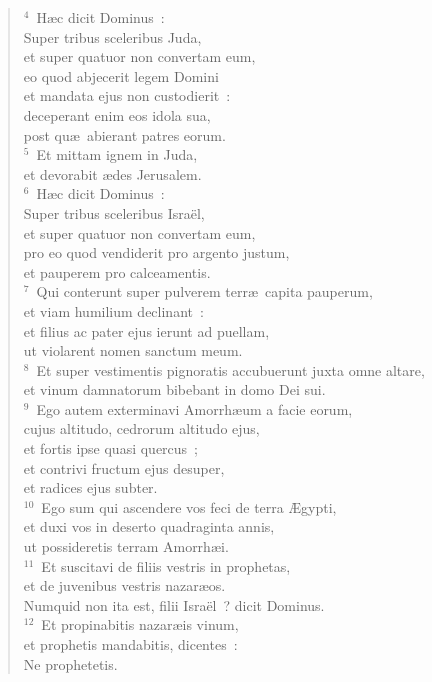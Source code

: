 \begin{verse}${}^{4}$~H\ae c dicit Dominus~:\\ Super tribus sceleribus Juda,\\ et super quatuor non convertam eum,\\ eo quod abjecerit legem Domini\\ et mandata ejus non custodierit~:\\ deceperant enim eos idola sua,\\ post qu\ae\ abierant patres eorum.\\
${}^{5}$~Et mittam ignem in Juda,\\ et devorabit \ae des Jerusalem.\\
${}^{6}$~H\ae c dicit Dominus~:\\ Super tribus sceleribus Isra\"el,\\ et super quatuor non convertam eum,\\ pro eo quod vendiderit pro argento justum,\\ et pauperem pro calceamentis.\\
${}^{7}$~Qui conterunt super pulverem terr\ae\ capita pauperum,\\ et viam humilium declinant~:\\ et filius ac pater ejus ierunt ad puellam,\\ ut violarent nomen sanctum meum.\\
${}^{8}$~Et super vestimentis pignoratis accubuerunt juxta omne altare,\\ et vinum damnatorum bibebant in domo Dei sui.\\
${}^{9}$~Ego autem exterminavi Amorrh\ae um a facie eorum,\\ cujus altitudo, cedrorum altitudo ejus,\\ et fortis ipse quasi quercus~;\\ et contrivi fructum ejus desuper,\\ et radices ejus subter.\\
${}^{10}$~Ego sum qui ascendere vos feci de terra \AE gypti,\\ et duxi vos in deserto quadraginta annis,\\ ut possideretis terram Amorrh\ae i.\\
${}^{11}$~Et suscitavi de filiis vestris in prophetas,\\ et de juvenibus vestris nazar\ae os.\\ Numquid non ita est, filii Isra\"el~? dicit Dominus.\\
${}^{12}$~Et propinabitis nazar\ae is vinum,\\ et prophetis mandabitis, dicentes~:\\ Ne prophetetis.\\

\end{verse}
